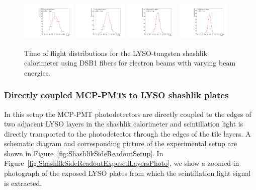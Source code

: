 \begin{figure}[H] \centering
\includegraphics[width=0.23\textwidth]{figs/TOF_ShashlikDSB1Fiber_Electron_4GeV} 
\includegraphics[width=0.23\textwidth]{figs/TOF_ShashlikDSB1Fiber_Electron_8GeV} 
\includegraphics[width=0.23\textwidth]{figs/TOF_ShashlikDSB1Fiber_Electron_16GeV} 
\includegraphics[width=0.23\textwidth]{figs/TOF_ShashlikDSB1Fiber_Electron_32GeV} 
\caption{\small Time of flight distributions for the LYSO-tungsten shashlik calorimeter
using DSB1 fibers for electron beams with varying beam energies.} 
\label{fig:ShashlikFiberTOF}
\end{figure}


\subsubsection{Directly coupled MCP-PMTs to LYSO shashlik plates}

In this setup the MCP-PMT photodetectors are directly coupled to the edges of two adjacent LYSO layers in the shashlik
calorimeter and scintillation light is directly transported to the photodetector
through the edges of the tile layers. A schematic diagram and corresponding
picture  of the experimental setup are shown in
Figure~\ref{fig:ShashlikSideReadoutSetup}. In
Figure~\ref{fig:ShashlikSideReadoutExposedLayersPhoto}, we show a zoomed-in
photograph of the exposed LYSO plates from which the scintillation light signal
is extracted.

